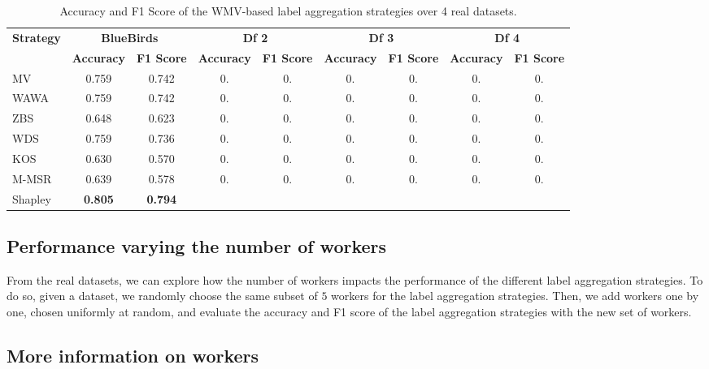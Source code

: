 \documentclass{cap2024}
\begin{document}
\begin{table}[h]
  \centering
  \caption{Accuracy and F1 Score of the WMV-based label aggregation strategies over 4 real datasets.}
  \label{tab:scores}
  \footnotesize{
  \begin{tabular}{l|cc|cc|cc|cc}
  \hline
  \multirow{2}{*}{\textbf{Strategy}} & \multicolumn{2}{c|}{\textbf{BlueBirds}} & \multicolumn{2}{c|}{\textbf{Df 2}} & \multicolumn{2}{c|}{\textbf{Df 3}} & \multicolumn{2}{c}{\textbf{Df 4}} \\
  \cline{2-9}
   & \textbf{Accuracy} & \textbf{F1 Score} & \textbf{Accuracy} & \textbf{F1 Score} & \textbf{Accuracy} & \textbf{F1 Score} & \textbf{Accuracy} & \textbf{F1 Score} \\
  \hline
  MV    & 0.759 & 0.742 & 0. & 0. & 0. & 0. & 0. & 0. \\
  WAWA  & 0.759 & 0.742 & 0. & 0. & 0. & 0. & 0. & 0. \\
  ZBS   & 0.648 & 0.623 & 0. & 0. & 0. & 0. & 0. & 0. \\
  WDS   & 0.759 & 0.736 & 0. & 0. & 0. & 0. & 0. & 0. \\
  KOS   & 0.630 & 0.570 & 0. & 0. & 0. & 0. & 0. & 0. \\
  M-MSR & 0.639 & 0.578 & 0. & 0. & 0. & 0. & 0. & 0. \\
  \rowcolor{lightgray} Shapley & \textbf{0.805}& \textbf{0.794}& & & & & & \\

  \hline
  \end{tabular}
  }
  \end{table}
\subsection{Performance varying the number of workers}

From the real datasets, we can explore how the number of workers impacts the performance of the different label aggregation strategies.
To do so, given a dataset, we randomly choose the same subset of $5$ workers for the label aggregation strategies.
Then, we add workers one by one, chosen uniformly at random, and evaluate the accuracy and F1 score of the label aggregation strategies with the new set of workers.



\subsection{More information on workers}
\end{document}
